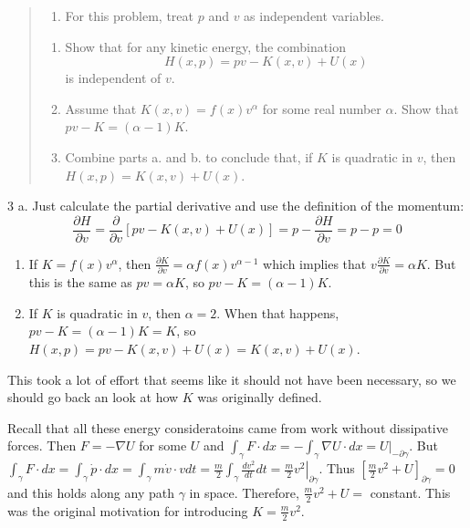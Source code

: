 \documentclass[
  letterpaper,
  DIV=11,
  numbers=noendperiod]{scrartcl}
\providecommand{\tightlist}{%
  \setlength{\itemsep}{0pt}\setlength{\parskip}{0pt}}
\begin{document}
\begin{quote}
\begin{enumerate}
\def\labelenumi{\arabic{enumi}.}
\setcounter{enumi}{2}
\tightlist
\item
  For this problem, treat \(p\) and \(v\) as independent variables.\\
\end{enumerate}

\begin{enumerate}
\def\labelenumi{\alph{enumi}.}
\tightlist
\item
  Show that for any kinetic energy, the combination
  \[H(x,p)=pv-K(x,v)+U(x)\] is independent of \(v\).\\
\item
  Assume that \(K(x,v)=f(x) v^\alpha\) for some real number \(\alpha\).
  Show that \(pv-K=(\alpha -1)K\).\\
\item
  Combine parts a. and b. to conclude that, if \(K\) is quadratic in
  \(v\), then \(H(x,p)=K(x,v)+U(x)\).
\end{enumerate}
\end{quote}

3 a. Just calculate the partial derivative and use the definition of the
momentum: \[
\frac{\partial H}{\partial v}
=\frac{\partial }{\partial v}\left[ pv-K(x,v)+U(x) \right]
=p-\frac{\partial H}{\partial v}
=p-p
=0
\]

\begin{enumerate}
\def\labelenumi{\alph{enumi}.}
\setcounter{enumi}{1}
\item
  If \(K=f(x)v^\alpha\), then
  \(\frac{\partial K}{\partial v}=\alpha f(x)v^{\alpha-1}\) which
  implies that \(v\frac{\partial K}{\partial v}=\alpha K\). But this is
  the same as \(pv=\alpha K\), so \(pv-K=(\alpha -1)K\).
\item
  If \(K\) is quadratic in \(v\), then \(\alpha=2\). When that happens,
  \(pv-K=(\alpha -1)K=K\), so \(H(x,p)=pv-K(x,v)+U(x)=K(x,v)+U(x)\).
\end{enumerate}

This took a lot of effort that seems like it should not have been
necessary, so we should go back an look at how \(K\) was originally
defined.

Recall that all these energy consideratoins came from work without
dissipative forces. Then \(F=-\nabla U\) for some \(U\) and
\(\int_\gamma F\cdot dx = - \int_\gamma \nabla U\cdot dx=\left. U\right|_{-\partial \gamma}\).
But
\(\int_\gamma F\cdot dx = \int_\gamma \dot p \cdot dx = \int_\gamma m \dot v \cdot v dt=\frac m2 \int_\gamma\frac {dv^2}{dt} dt=\left.\frac m2 v^2\right|_{\partial \gamma}\).
Thus \(\left[\frac m2 v^2+U\right]_{\partial \gamma}=0\) and this holds
along any path \(\gamma\) in space. Therefore, \(\frac m2 v^2+U =\)
constant. This was the original motivation for introducing
\(K=\frac m2 v^2\).
\end{document}
